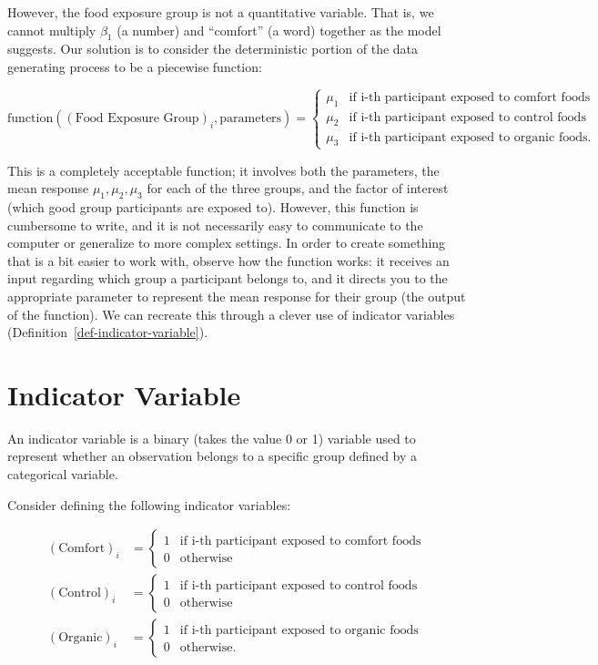 \documentclass[
  letterpaper,
  DIV=11,
  numbers=noendperiod]{scrreprt}
\theoremstyle{definition}
\theoremstyle{definition}
\theoremstyle{plain}
\theoremstyle{remark}
\begin{document}
However, the food exposure group is not a quantitative variable. That
is, we cannot multiply \(\beta_1\) (a number) and ``comfort'' (a word)
together as the model suggests. Our solution is to consider the
deterministic portion of the data generating process to be a piecewise
function:

\[
\text{function}\left((\text{Food Exposure Group})_i, \text{parameters}\right) =
\begin{cases}
  \mu_1 & \text{if i-th participant exposed to comfort foods} \\
  \mu_2 & \text{if i-th participant exposed to control foods} \\
  \mu_3 & \text{if i-th participant exposed to organic foods.} 
\end{cases}
\]

This is a completely acceptable function; it involves both the
parameters, the mean response \(\mu_1, \mu_2, \mu_3\) for each of the
three groups, and the factor of interest (which good group participants
are exposed to). However, this function is cumbersome to write, and it
is not necessarily easy to communicate to the computer or generalize to
more complex settings. In order to create something that is a bit easier
to work with, observe how the function works: it receives an input
regarding which group a participant belongs to, and it directs you to
the appropriate parameter to represent the mean response for their group
(the output of the function). We can recreate this through a clever use
of indicator variables (Definition~\ref{def-indicator-variable}).

\section{Indicator Variable}\label{indicator-variable-1}

An indicator variable is a binary (takes the value 0 or 1) variable used
to represent whether an observation belongs to a specific group defined
by a categorical variable.

Consider defining the following indicator variables:

\[
\begin{aligned}
  (\text{Comfort})_i 
    &= \begin{cases} 1 & \text{if i-th participant exposed to comfort foods} \\ 0 & \text{otherwise} \end{cases} \\
  (\text{Control})_i 
    &= \begin{cases} 1 & \text{if i-th participant exposed to control foods} \\ 0 & \text{otherwise} \end{cases} \\
  (\text{Organic})_i 
    &= \begin{cases} 1 & \text{if i-th participant exposed to organic foods} \\ 0 & \text{otherwise}. \end{cases}
\end{aligned}
\]
\end{document}
